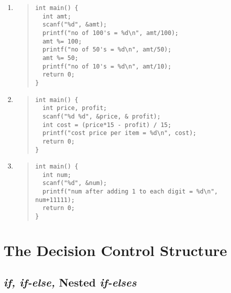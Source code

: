 \documentclass{report}
\begin{document}
\begin{enumerate}
  \item \begin{quote} \begin{verbatim}
int main() {
  int amt;
  scanf("%d", &amt);
  printf("no of 100's = %d\n", amt/100);
  amt %= 100;
  printf("no of 50's = %d\n", amt/50);
  amt %= 50;
  printf("no of 10's = %d\n", amt/10);
  return 0;
}
  \end{verbatim} \end{quote} 

  \item \begin{quote} \begin{verbatim}
int main() {
  int price, profit;
  scanf("%d %d", &price, & profit);
  int cost = (price*15 - profit) / 15;
  printf("cost price per item = %d\n", cost);
  return 0;
}
  \end{verbatim} \end{quote} 

  \item \begin{quote} \begin{verbatim}
int main() {
  int num;
  scanf("%d", &num);
  printf("num after adding 1 to each digit = %d\n", num+11111);
  return 0;
}
  \end{verbatim} \end{quote} 
\end{enumerate}

\chapter{The Decision Control Structure}
\section*{\textit{if, if-else,} Nested \textit{if-elses}}
\end{document}
